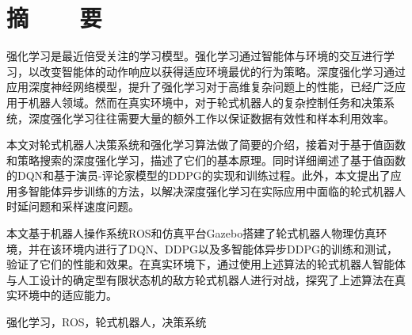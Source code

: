 ﻿%
%
%


%
%
\renewcommand{\baselinestretch}{1.5}
\fontsize{12pt}{13pt}\selectfont

\chapter*{摘~~~~要}
强化学习是最近倍受关注的学习模型。强化学习通过智能体与环境的交互进行学习，以改变智能体的动作响应以获得适应环境最优的行为策略。深度强化学习通过应用深度神经网络模型，提升了强化学习对于高维复杂问题上的性能，已经广泛应用于机器人领域。然而在真实环境中，对于轮式机器人的复杂控制任务和决策系统，深度强化学习往往需要大量的额外工作以保证数据有效性和样本利用效率。

本文对轮式机器人决策系统和强化学习算法做了简要的介绍，接着对于基于值函数和策略搜索的深度强化学习，描述了它们的基本原理。同时详细阐述了基于值函数的DQN和基于演员-评论家模型的DDPG的实现和训练过程。此外，本文提出了应用多智能体异步训练的方法，以解决深度强化学习在实际应用中面临的轮式机器人时延问题和采样速度问题。

本文基于机器人操作系统ROS和仿真平台Gazebo搭建了轮式机器人物理仿真环境，并在该环境内进行了DQN、DDPG以及多智能体异步DDPG的训练和测试，验证了它们的性能和效果。在真实环境下，通过使用上述算法的轮式机器人智能体与人工设计的确定型有限状态机的敌方轮式机器人进行对战，探究了上述算法在真实环境中的适应能力。

\vspace{1em}
 \quad 强化学习，ROS，轮式机器人，决策系统

